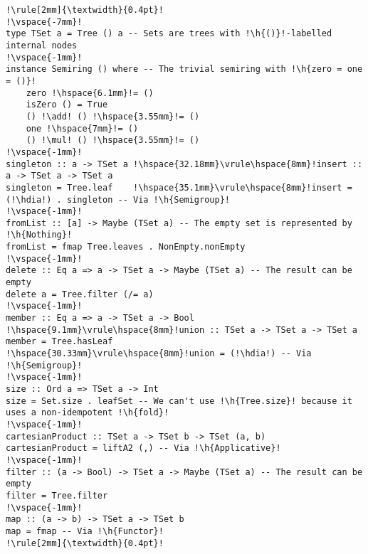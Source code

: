 \documentclass[english,submission]{programming}
\newcommand{\code}[1]{\lstinline[mathescape]|#1|}
\newcommand{\hcode}[1]{{\color{darkblue} \lstinline[keywordstyle={}]|#1|}} %
\newcommand{\h}[1]{{\itshape\color{grayblue}#1}} %
\newcommand{\hdia}{\,\text{\raisebox{-0.2mm}{\Large\color{darkblue} $\diamond$}}\,}
\newcommand{\add}{\text{\raisebox{-0.1mm}{\large $\oplus$}}}
\newcommand{\mul}{\text{\raisebox{-0.1mm}{\large $\otimes$}}}
\begin{document}
\begin{lstlisting}[label=lst-set,xleftmargin=0pt,belowskip=7pt,caption={
    Implementing a part of the standard \code{Data.S}\code{et} API with
    \hcode{TSet}.
}]
!\rule[2mm]{\textwidth}{0.4pt}!
!\vspace{-7mm}!
type TSet a = Tree () a -- Sets are trees with !\h{()}!-labelled internal nodes
!\vspace{-1mm}!
instance Semiring () where -- The trivial semiring with !\h{zero = one = ()}!
    zero !\hspace{6.1mm}!= ()
    isZero () = True
    () !\add! () !\hspace{3.55mm}!= ()
    one !\hspace{7mm}!= ()
    () !\mul! () !\hspace{3.55mm}!= ()
!\vspace{-1mm}!
singleton :: a -> TSet a !\hspace{32.18mm}\vrule\hspace{8mm}!insert :: a -> TSet a -> TSet a
singleton = Tree.leaf    !\hspace{35.1mm}\vrule\hspace{8mm}!insert = (!\hdia!) . singleton -- Via !\h{Semigroup}!
!\vspace{-1mm}!
fromList :: [a] -> Maybe (TSet a) -- The empty set is represented by !\h{Nothing}!
fromList = fmap Tree.leaves . NonEmpty.nonEmpty
!\vspace{-1mm}!
delete :: Eq a => a -> TSet a -> Maybe (TSet a) -- The result can be empty
delete a = Tree.filter (/= a)
!\vspace{-1mm}!
member :: Eq a => a -> TSet a -> Bool !\hspace{9.1mm}\vrule\hspace{8mm}!union :: TSet a -> TSet a -> TSet a
member = Tree.hasLeaf                 !\hspace{30.33mm}\vrule\hspace{8mm}!union = (!\hdia!) -- Via !\h{Semigroup}!
!\vspace{-1mm}!
size :: Ord a => TSet a -> Int
size = Set.size . leafSet -- We can't use !\h{Tree.size}! because it uses a non-idempotent !\h{fold}!
!\vspace{-1mm}!
cartesianProduct :: TSet a -> TSet b -> TSet (a, b)
cartesianProduct = liftA2 (,) -- Via !\h{Applicative}!
!\vspace{-1mm}!
filter :: (a -> Bool) -> TSet a -> Maybe (TSet a) -- The result can be empty
filter = Tree.filter
!\vspace{-1mm}!
map :: (a -> b) -> TSet a -> TSet b
map = fmap -- Via !\h{Functor}!
!\rule[2mm]{\textwidth}{0.4pt}!
\end{lstlisting}
\end{document}
